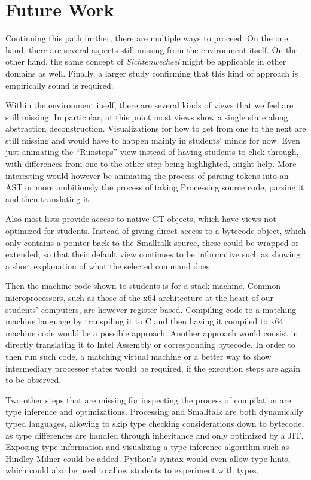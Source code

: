 \section{Future Work} \label{sc_future}

Continuing this path further, there are multiple ways to proceed. On the one hand, there are several aspects still missing from the environment itself. On the other hand, the same concept of \emph{Sichtenwechsel} might be applicable in other domains as well. Finally, a larger study confirming that this kind of approach is empirically sound is required.

Within the environment itself, there are several kinds of views that we feel are still missing. In particular, at this point most views show a single state along abstraction deconstruction. Visualizations for how to get from one to the next are still missing and would have to happen mainly in students' minds for now. Even just animating the ``Runsteps'' view instead of having students to click through, with differences from one to the other step being highlighted, might help. More interesting would however be animating the process of parsing tokens into an \ac{AST} or more ambitiously the process of taking Processing source code, parsing it and then translating it.

Also most lists provide access to native \ac{GT} objects, which have views not optimized for students. Instead of \eg giving direct access to a bytecode object, which only contains a pointer back to the Smalltalk source, these could be wrapped or extended, so that their default view continues to be informative such as showing a short explanation of what the selected command does.

Then the machine code shown to students is for a stack machine. Common microprocessors, such as those of the x64 architecture at the heart of our students' computers, are however register based. Compiling code to a matching machine language by \eg transpiling it to C and then having it compiled to x64 machine code would be a possible approach. Another approach would consist in directly translating it to Intel Assembly or corresponding bytecode. In order to then run such code, a matching virtual machine or a better way to show intermediary processor states would be required, if the execution steps are again to be observed.

Two other steps that are missing for inspecting the process of compilation are type inference and optimizations. Processing and Smalltalk are both dynamically typed languages, allowing to skip type checking considerations down to bytecode, as type differences are handled through inheritance and only optimized by a \ac{JIT}. Exposing type information and visualizing a type inference algorithm such as Hindley-Milner could be added. Python's syntax would even allow type hints, which could also be used to allow students to experiment with types.


